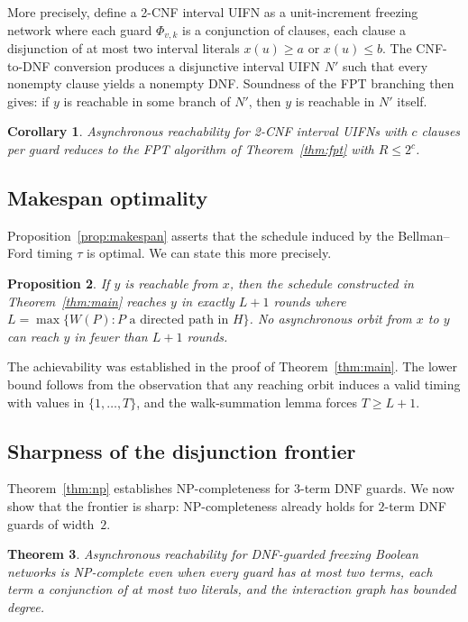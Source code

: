 \documentclass[final,3p,times]{elsarticle}
\newtheorem{theorem}{Theorem}
\newtheorem{proposition}[theorem]{Proposition}
\newtheorem{corollary}[theorem]{Corollary}
\theoremstyle{definition}
\theoremstyle{remark}
\begin{document}
More precisely, define a 2-CNF interval UIFN as a unit-increment freezing network where each guard $\Phi_{v,k}$ is a conjunction of clauses, each clause a disjunction of at most two interval literals $x(u)\ge a$ or $x(u)\le b$.
The CNF-to-DNF conversion produces a disjunctive interval UIFN $N'$ such that every nonempty clause yields a nonempty DNF.
Soundness of the FPT branching then gives: if $y$ is reachable in some branch of $N'$, then $y$ is reachable in $N'$ itself.

\begin{corollary}\label{cor:cnf2}
Asynchronous reachability for 2-CNF interval UIFNs with $c$ clauses per guard reduces to the FPT algorithm of Theorem~\ref{thm:fpt} with $R\le 2^c$.
\end{corollary}

\subsection*{Makespan optimality}

Proposition~\ref{prop:makespan} asserts that the schedule induced by the Bellman--Ford timing $\tau$ is optimal.
We can state this more precisely.

\begin{proposition}\label{prop:makespan-opt}
If $y$ is reachable from $x$, then the schedule constructed in Theorem~\ref{thm:main} reaches $y$ in exactly $L+1$ rounds where $L=\max\{W(P):P\text{ a directed path in }H\}$.
No asynchronous orbit from $x$ to $y$ can reach $y$ in fewer than $L+1$ rounds.
\end{proposition}

The achievability was established in the proof of Theorem~\ref{thm:main}.
The lower bound follows from the observation that any reaching orbit induces a valid timing with values in $\{1,\dots,T\}$, and the walk-summation lemma forces $T\ge L+1$.

\subsection*{Sharpness of the disjunction frontier}

Theorem~\ref{thm:np} establishes NP-completeness for $3$-term DNF guards.
We now show that the frontier is sharp: NP-completeness already holds for $2$-term DNF guards of width~$2$.

\begin{theorem}\label{thm:two-term}
Asynchronous reachability for DNF-guarded freezing Boolean networks is NP-complete even when every guard has at most two terms, each term a conjunction of at most two literals, and the interaction graph has bounded degree.
\end{theorem}
\end{document}
